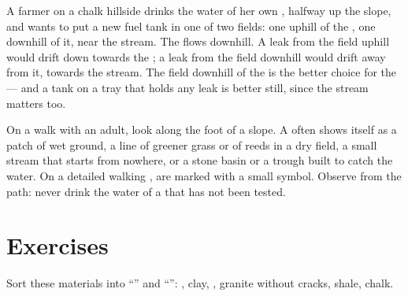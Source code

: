 \begin{example}\label{ex:g6:water-underground:tank}
A farmer on a chalk hillside drinks the water of her own , halfway up
the slope, and wants to put a new fuel tank in one of two fields: one
uphill of the , one downhill of it, near the stream. The 
flows downhill. A leak from the field uphill would drift down towards the
; a leak from the field downhill would drift away from it, towards the
stream. The field downhill of the  is the better choice for the 
--- and a tank on a tray that holds any leak is better still, since the
stream matters too.
\end{example}

\begin{inthefield}
On a walk with an adult, look along the foot of a slope. A  often
shows itself as a patch of wet ground, a line of greener grass or of reeds
in a dry field, a small stream that starts from nowhere, or a stone basin or
a trough built to catch the water. On a detailed walking ,  are
marked with a small symbol. Observe from the path: never drink the
water of a  that has not been tested.
\end{inthefield}

\section{Exercises}

\begin{exercise}[$\star$]\label{exo:g6:water-underground:1}
Sort these materials into ``'' and ``'': ,
clay, , granite without cracks, shale, chalk.
\end{exercise}

